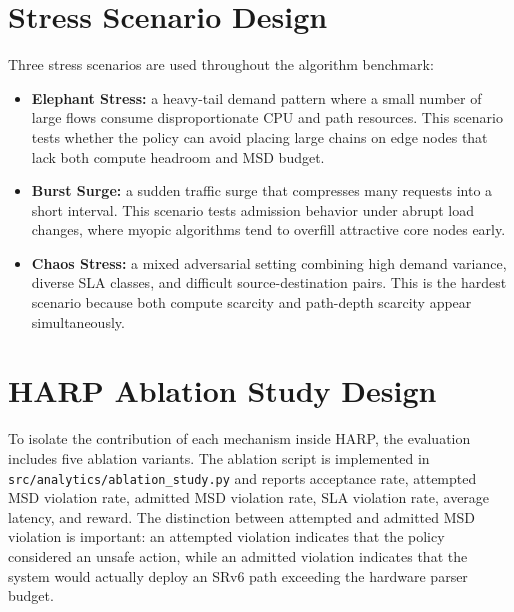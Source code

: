 \documentclass[12pt, a4paper, reqno, oneside]{book}
\begin{document}
\section{Stress Scenario Design}

Three stress scenarios are used throughout the algorithm benchmark:

\begin{itemize}
    \item \textbf{Elephant Stress:} a heavy-tail demand pattern where a small number of large flows consume disproportionate CPU and path resources. This scenario tests whether the policy can avoid placing large chains on edge nodes that lack both compute headroom and MSD budget.
    \item \textbf{Burst Surge:} a sudden traffic surge that compresses many requests into a short interval. This scenario tests admission behavior under abrupt load changes, where myopic algorithms tend to overfill attractive core nodes early.
    \item \textbf{Chaos Stress:} a mixed adversarial setting combining high demand variance, diverse SLA classes, and difficult source-destination pairs. This is the hardest scenario because both compute scarcity and path-depth scarcity appear simultaneously.
\end{itemize}

\section{HARP Ablation Study Design}

To isolate the contribution of each mechanism inside HARP, the evaluation includes five ablation variants. The ablation script is implemented in \texttt{src/analytics/ablation\_study.py} and reports acceptance rate, attempted MSD violation rate, admitted MSD violation rate, SLA violation rate, average latency, and reward. The distinction between attempted and admitted MSD violation is important: an attempted violation indicates that the policy considered an unsafe action, while an admitted violation indicates that the system would actually deploy an SRv6 path exceeding the hardware parser budget.
\end{document}
